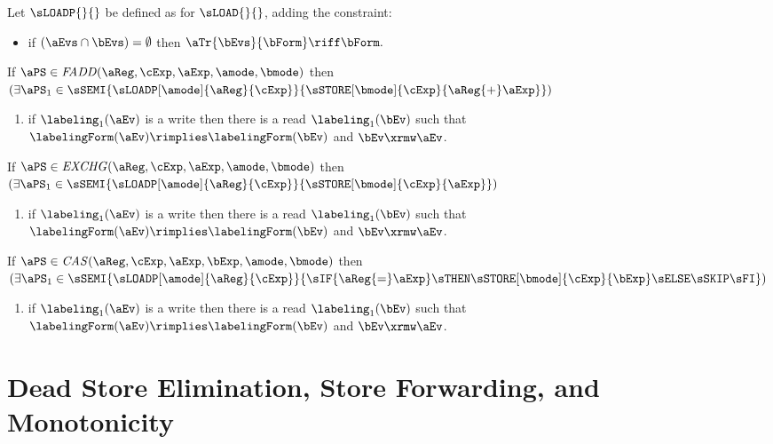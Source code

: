 \begin{definition}
  Let $\sLOADP{}{}$ be defined as for $\sLOAD{}{}$, adding the constraint:
  \begin{itemize}
  \item[{\labeltextXX{4d}{r}{read-tau-rmw}}]
    if $(\aEvs\cap\bEvs)=\emptyset$ then
    \begin{math}
      \aTr{\bEvs}{\bForm} \riff
      \bForm.
    \end{math}
  \end{itemize}
  If $\aPS\in\mathit{FADD}(\aReg,\cExp,\aExp,\amode,\bmode)$ then
  $(\exists \aPS_1\in\sSEMI{\sLOADP[\amode]{\aReg}{\cExp}}{\sSTORE[\bmode]{\cExp}{\aReg{+}\aExp}})$
  \begin{enumerate}[topsep=0pt,label=(\textsc{u}\arabic*),ref=\textsc{u}\arabic*]
  \item if $\labeling_1(\aEv)$ is a write then there is a read $\labeling_1(\bEv)$ such that 
    $\labelingForm(\aEv)\rimplies\labelingForm(\bEv)$ and
    $\bEv\xrmw\aEv$.
  \end{enumerate}
  If $\aPS\in\mathit{EXCHG}(\aReg,\cExp,\aExp,\amode,\bmode)$ then
  $(\exists \aPS_1\in\sSEMI{\sLOADP[\amode]{\aReg}{\cExp}}{\sSTORE[\bmode]{\cExp}{\aExp}})$
  \begin{enumerate}[topsep=0pt,label=(\textsc{u}\arabic*),ref=\textsc{u}\arabic*]
  \item if $\labeling_1(\aEv)$ is a write then there is a read $\labeling_1(\bEv)$ such that 
    $\labelingForm(\aEv)\rimplies\labelingForm(\bEv)$ and
    $\bEv\xrmw\aEv$.
  \end{enumerate}
  If $\aPS\in\mathit{CAS}(\aReg,\cExp,\aExp,\bExp,\amode,\bmode)$ then
  $(\exists \aPS_1\in\sSEMI{\sLOADP[\amode]{\aReg}{\cExp}}{\sIF{\aReg{=}\aExp}\sTHEN\sSTORE[\bmode]{\cExp}{\bExp}\sELSE\sSKIP\sFI})$
  \begin{enumerate}[topsep=0pt,label=(\textsc{u}\arabic*),ref=\textsc{u}\arabic*]
  \item if $\labeling_1(\aEv)$ is a write then there is a read $\labeling_1(\bEv)$ such that 
    $\labelingForm(\aEv)\rimplies\labelingForm(\bEv)$ and
    $\bEv\xrmw\aEv$.
  \end{enumerate}
\end{definition}


\section{Dead Store Elimination, Store Forwarding, and Monotonicity}

